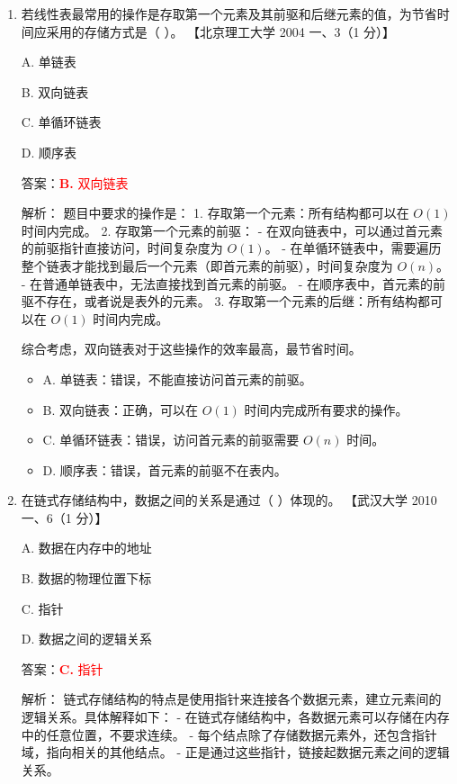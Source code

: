 \documentclass[lang=cn,newtx,10pt,scheme=chinese]{../../../elegantbook}
\begin{document}
\begin{enumerate}
        \item 若线性表最常用的操作是存取第一个元素及其前驱和后继元素的值，为节省时间应采用的存储方式是（ ）。  
        【北京理工大学 2004 一、3（1 分）】  
    
        A. 单链表  
    
        B. 双向链表  
    
        C. 单循环链表  
    
        D. 顺序表  

        答案：\textcolor{red}{\textbf{B.} 双向链表}

        解析：
        题目中要求的操作是：
        1. 存取第一个元素：所有结构都可以在 $O(1)$ 时间内完成。
        2. 存取第一个元素的前驱：
           - 在双向链表中，可以通过首元素的前驱指针直接访问，时间复杂度为 $O(1)$。
           - 在单循环链表中，需要遍历整个链表才能找到最后一个元素（即首元素的前驱），时间复杂度为 $O(n)$。
           - 在普通单链表中，无法直接找到首元素的前驱。
           - 在顺序表中，首元素的前驱不存在，或者说是表外的元素。
        3. 存取第一个元素的后继：所有结构都可以在 $O(1)$ 时间内完成。

        综合考虑，双向链表对于这些操作的效率最高，最节省时间。

        \begin{itemize}
            \item A. 单链表：错误，不能直接访问首元素的前驱。
            \item B. 双向链表：正确，可以在 $O(1)$ 时间内完成所有要求的操作。
            \item C. 单循环链表：错误，访问首元素的前驱需要 $O(n)$ 时间。
            \item D. 顺序表：错误，首元素的前驱不在表内。
        \end{itemize}
    
        \item 在链式存储结构中，数据之间的关系是通过（ ）体现的。  
        【武汉大学 2010 一、6（1 分）】  
    
        A. 数据在内存中的地址  
    
        B. 数据的物理位置下标  
    
        C. 指针  
    
        D. 数据之间的逻辑关系  

        答案：\textcolor{red}{\textbf{C.} 指针}

        解析：
        链式存储结构的特点是使用指针来连接各个数据元素，建立元素间的逻辑关系。具体解释如下：
        - 在链式存储结构中，各数据元素可以存储在内存中的任意位置，不要求连续。
        - 每个结点除了存储数据元素外，还包含指针域，指向相关的其他结点。
        - 正是通过这些指针，链接起数据元素之间的逻辑关系。


\end{enumerate}
\end{document}
